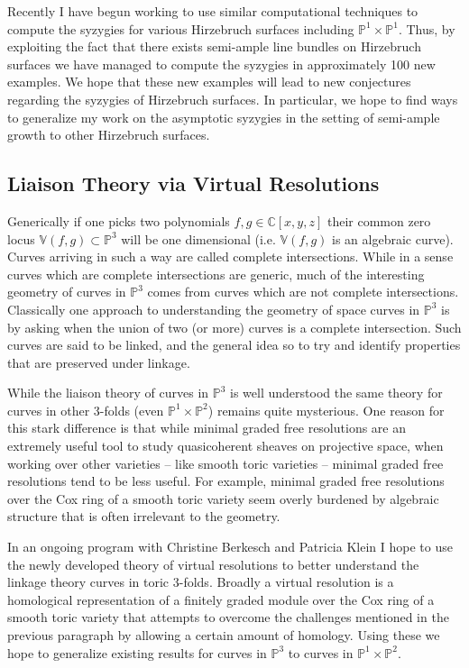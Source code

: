 \documentclass[10pt,reqno]{amsart}
\theoremstyle{remark}
\newcommand{\C}{\mathbb{C}}
\renewcommand{\P}{\mathbb{P}}
\newcommand{\V}{\mathbb{V}}
\begin{document}
Recently I have begun working to use similar computational techniques to compute the syzygies for various Hirzebruch surfaces including $\P^1\times\P^1$. Thus, by exploiting the fact that there exists semi-ample line bundles on Hirzebruch surfaces we have managed to compute the syzygies in approximately 100 new examples. We hope that these new examples will lead to new conjectures regarding the syzygies of Hirzebruch surfaces. In particular, we hope to find ways to generalize my work on the asymptotic syzygies in the setting of semi-ample growth to other Hirzebruch surfaces. 

\subsection{Liaison Theory via Virtual Resolutions}

Generically if one picks two polynomials $f,g\in \C[x,y,z]$ their common zero locus $\V(f,g)\subset \P^3$ will be one dimensional (i.e. $\V(f,g)$ is an algebraic curve). Curves arriving in such a way are called complete intersections. While in a sense curves which are complete intersections are generic, much of the interesting geometry of curves in $\P^3$ comes from curves which are not complete intersections. Classically one approach to understanding the geometry of space curves in $\P^3$ is by asking when the union of two (or more) curves is a complete intersection. Such curves are said to be linked, and the general idea so to try and identify properties that are preserved under linkage. 

While the liaison theory of curves in $\P^3$ is well understood the same theory for curves in other 3-folds (even $\P^1\times\P^2$) remains quite mysterious. One reason for this stark difference is that while minimal graded free resolutions are an extremely useful tool to study quasicoherent sheaves on projective space, when working over other varieties -- like smooth toric varieties --  minimal graded free resolutions tend to be less useful. For example, minimal graded free resolutions over the Cox ring of a smooth toric variety seem overly burdened by algebraic structure that is often irrelevant to the geometry. 

In an ongoing program with Christine Berkesch and Patricia Klein I hope to use the newly developed theory of virtual resolutions to better understand the linkage theory curves in toric 3-folds. Broadly a virtual resolution is a homological representation of a finitely graded module over the Cox ring of a smooth toric variety that attempts to overcome the challenges mentioned in the previous paragraph by allowing a certain amount of homology. Using these we hope to generalize existing results for curves in $\P^3$ to curves in $\P^1\times\P^2$. 
\end{document}
